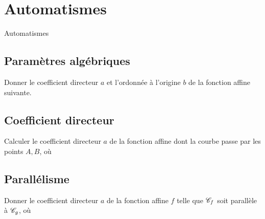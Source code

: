 
\AdvanceDate[3]



\section{Automatismes}

\begin{frame}

\centering \huge
Automatismes

\end{frame}

\subsection{Paramètres algébriques}

\begin{frame}{1}	
	Donner le coefficient directeur $a$ et l'ordonnée à l'origine $b$ de la fonction affine suivante.
	\boxAB{
		\[ f(x) = 0 \]
	}{
		\[ g(x) = 6 - x \]
	}
\end{frame}

\subsection{Coefficient directeur}

\begin{frame}{2}	

	Calculer le coefficient directeur $a$ de la fonction affine dont la courbe passe par les points $A, B$, où
	
\end{frame}

\subsection{Parallélisme}

\begin{frame}{3}

	Donner le coefficient directeur $a$ de la fonction affine $f$ telle que $\mathcal{C}_f$ soit parallèle à $\mathcal{C}_g$, où
	
\end{frame}


